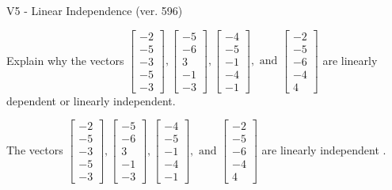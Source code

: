 \begin{exercise}
  \begin{exerciseTitle}V5 - Linear Independence (ver. 596)\end{exerciseTitle}
  \begin{exerciseStatement}
    Explain why the vectors \(\left[\begin{array}{r}
-2 \\
-5 \\
-3 \\
-5 \\
-3
\end{array}\right] , \left[\begin{array}{r}
-5 \\
-6 \\
3 \\
-1 \\
-3
\end{array}\right] , \left[\begin{array}{r}
-4 \\
-5 \\
-1 \\
-4 \\
-1
\end{array}\right] , \text{ and } \left[\begin{array}{r}
-2 \\
-5 \\
-6 \\
-4 \\
4
\end{array}\right]\) are linearly dependent or linearly independent.	


  \end{exerciseStatement}
  \begin{exerciseAnswer}
   The vectors \(\left[\begin{array}{r}
-2 \\
-5 \\
-3 \\
-5 \\
-3
\end{array}\right] , \left[\begin{array}{r}
-5 \\
-6 \\
3 \\
-1 \\
-3
\end{array}\right] , \left[\begin{array}{r}
-4 \\
-5 \\
-1 \\
-4 \\
-1
\end{array}\right] , \text{ and } \left[\begin{array}{r}
-2 \\
-5 \\
-6 \\
-4 \\
4
\end{array}\right]\) are 
  	 linearly independent  .
  


  \end{exerciseAnswer}
\end{exercise}
